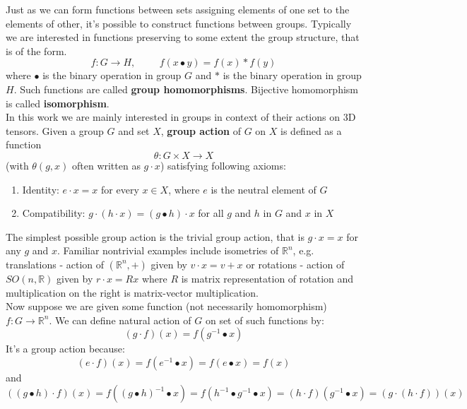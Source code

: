         Just as we can form functions between sets assigning elements of one set to
        the elements of other, it's possible to construct functions between groups.
        Typically we are interested in functions preserving to some extent the group structure,
        that is of the form.
        \begin{equation}
            f:G \to H, \hspace{1cm} f(x\bullet y) = f(x) \ast f(y)
        \end{equation}
        where $\bullet$ is the binary operation in group $G$ and $\ast$ is the binary operation
        in group $H$. Such functions are called \textbf{group homomorphisms}.
        Bijective homomorphism is called \textbf{isomorphism}.\\

        In this work we are mainly interested in groups in context of their actions
        on 3D tensors. Given a group $G$ and set $X$,
        \textbf{group action} of $G$ on $X$ is defined as a function
        \begin{equation}
            \theta: G \times X \to X
        \end{equation}
        (with $\theta(g,x)$ often written as $g\cdot x$) satisfying following axioms:
        \begin{enumerate}
            \item Identity: $e \cdot x = x$ for every $x \in X$, where $e$ is the neutral element
                    of $G$
            \item Compatibility: $g \cdot \left(h \cdot x\right) =
                \left(g \bullet h \right) \cdot x$ for all $g$ and $h$ in $G$ and $x$ in $X$
        \end{enumerate}
        The simplest possible group action is the trivial group action, that is
        $g\cdot x = x$ for any $g$ and $x$. Familiar nontrivial examples include isometries
        of $\mathbb{R}^n$, e.g.
        translations - action of $\left(\mathbb{R}^n,+\right)$ given by $v \cdot x = v+x$ or
        rotations - action of $SO(n,\mathbb{R})$ given by $r \cdot x = Rx$ where
        $R$ is matrix representation of rotation and
        multiplication on the right is matrix-vector multiplication.\\
        Now suppose we are given some function (not necessarily homomorphism)
        $f:G\to \mathbb{R}^n$.
        We can define natural action of $G$ on set of such functions by:
        \begin{equation}
            (g\cdot f)(x) = f(g^{-1}\bullet x)
            \label{eq:action_on_function}
        \end{equation}
        It's a group action because:
        $$(e\cdot f)(x) = f(e^{-1}\bullet x) = f(e \bullet x) = f(x)$$
        and
        $$ ((g\bullet h) \cdot f)(x) = f((g\bullet h)^{-1} \bullet x) =
            f(h^{-1}\bullet g^{-1} \bullet x) = (h\cdot f)(g^{-1} \bullet x) =
            (g\cdot(h \cdot f))(x)$$








